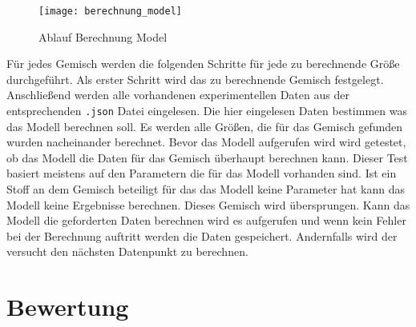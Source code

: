 \documentclass[../thesis.tex]{subfiles}
\begin{document}
\begin{figure}[htb]
	\centering
	\texttt{[image: berechnung\_model]}
	\caption{Ablauf Berechnung Model}
	\label{fig: model_berechnung}
\end{figure}

Für jedes Gemisch werden die folgenden Schritte für jede zu berechnende Größe durchgeführt. Als erster Schritt wird das zu berechnende Gemisch festgelegt. Anschließend werden alle vorhandenen experimentellen Daten aus der entsprechenden \texttt{.json} Datei eingelesen. Die hier eingelesen Daten bestimmen was das Modell berechnen soll. Es werden alle Größen, die für das Gemisch gefunden wurden nacheinander berechnet. Bevor das Modell aufgerufen wird wird getestet, ob das Modell die Daten für das Gemisch überhaupt berechnen kann. Dieser Test basiert meistens auf den Parametern die für das Modell vorhanden sind. Ist ein Stoff an dem Gemisch beteiligt für das das Modell keine Parameter hat kann das Modell keine Ergebnisse berechnen. Dieses Gemisch wird übersprungen.
Kann das Modell die geforderten Daten berechnen wird es aufgerufen und wenn kein Fehler bei der Berechnung auftritt werden die Daten gespeichert. Andernfalls wird der versucht den nächsten Datenpunkt zu berechnen.

\section{Bewertung}
\end{document}
